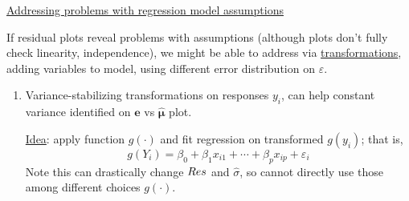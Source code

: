 \underline{Addressing problems with regression model assumptions}

If residual plots reveal problems with assumptions
(although plots don't fully check linearity, independence),
we might be able to address via \underline{transformations},
adding variables to model, using different error
distribution on $ \varepsilon $.
\begin{enumerate}[label=(\arabic*)]
      \item Variance-stabilizing transformations on
            responses $ y_i $, can help constant variance identified
            on $ \symbf{e} $ vs $ \hat{\symbf{\mu}} $ plot.

            \underline{Idea}: apply function $ g(\cdot) $ and fit
            regression on transformed $ g(y_i) $; that is,
            \[ g(Y_i)=\beta_0+\beta_1x_{i1}+\cdots+\beta_p x_{ip}+\varepsilon_i \]
            Note this can drastically change $ \relax{Res} $
            and $ \hat{\sigma} $, so cannot directly use those among different
            choices $ g(\cdot) $.


\end{enumerate}
